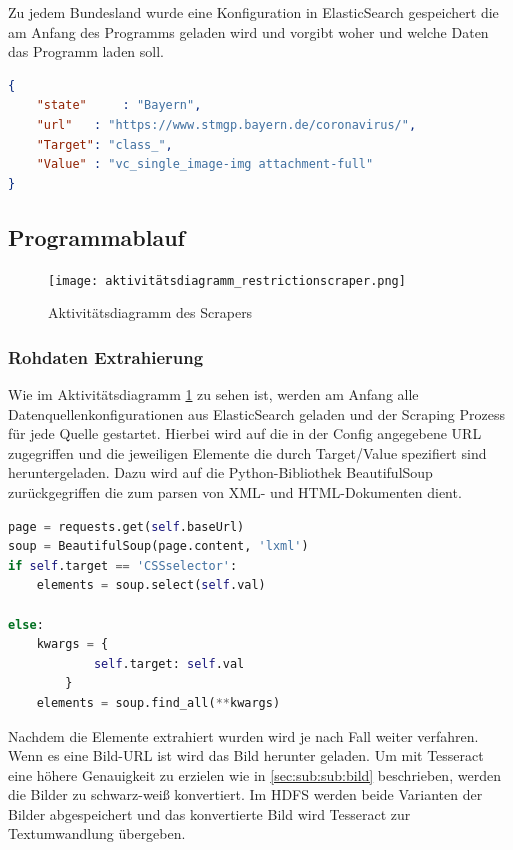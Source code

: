 \documentclass[12pt,oneside,a4paper,parskip]{scrbook}
\begin{document}
Zu jedem Bundesland wurde eine Konfiguration in ElasticSearch gespeichert die am Anfang des Programms geladen wird und vorgibt woher und welche Daten das Programm laden soll.

\begin{lstlisting}[caption=Config von Bayern, language=json]
{
	"state" 	: "Bayern",
	"url"	: "https://www.stmgp.bayern.de/coronavirus/",
	"Target": "class_",
	"Value"	: "vc_single_image-img attachment-full"
}
\end{lstlisting}

\subsection{Programmablauf}

\begin{figure}[H]
\caption{Aktivitätsdiagramm des Scrapers}
\label{activityRestriction}
\centering
\texttt{[image: aktivitätsdiagramm\_restrictionscraper.png]}
\end{figure}
\pagebreak
\subsubsection{Rohdaten Extrahierung}\label{sec:sub:sub:rohdaten}

Wie im Aktivitätsdiagramm \cref{activityRestriction} zu sehen ist, werden am Anfang alle Datenquellenkonfigurationen aus ElasticSearch geladen und der Scraping Prozess für jede Quelle gestartet. Hierbei wird auf die in der Config angegebene URL zugegriffen und die jeweiligen Elemente die durch Target/Value spezifiert sind heruntergeladen. Dazu wird auf die Python-Bibliothek BeautifulSoup zurückgegriffen die zum parsen von XML- und HTML-Dokumenten dient.

\begin{lstlisting}[basicstyle=\small, caption=Parsen und filtern der Website, language=Python]
page = requests.get(self.baseUrl)
soup = BeautifulSoup(page.content, 'lxml')
if self.target == 'CSSselector':
    elements = soup.select(self.val)

else:
    kwargs = {
            self.target: self.val
        }
    elements = soup.find_all(**kwargs)
\end{lstlisting}

Nachdem die Elemente extrahiert wurden wird je nach Fall weiter verfahren. Wenn es eine Bild-URL ist wird das Bild herunter geladen. Um mit Tesseract eine höhere Genauigkeit zu erzielen wie in \cref{sec:sub:sub:bild} beschrieben, werden die Bilder zu schwarz-weiß konvertiert. Im HDFS werden beide Varianten der Bilder abgespeichert und das konvertierte Bild wird Tesseract zur Textumwandlung übergeben.
\end{document}
